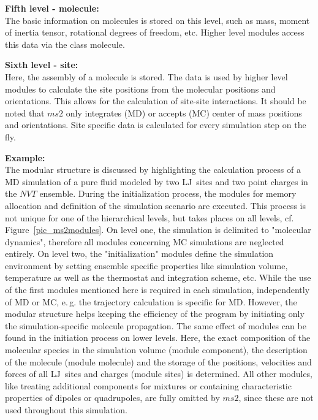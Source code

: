 \textbf{Fifth level - molecule:}\\
The basic information on molecules is stored on this level, such as mass, moment of inertia tensor, rotational degrees of freedom, etc. Higher level modules access this data via the class molecule.

\textbf{Sixth level - site:}\\
Here, the assembly of a molecule is stored. The data is used by higher level modules to calculate the site positions from the molecular positions and orientations. This allows for the calculation of site-site interactions. It should be noted that $ms2$ only integrates (MD) or accepts (MC) center of mass positions and orientations. Site specific data is calculated for every simulation step on the fly.
% 

\textbf{Example:}\\
The modular structure is discussed by highlighting the calculation process of a MD simulation of a pure fluid modeled by two LJ~sites and two point charges in the $NVT$ ensemble. During the initialization process, the modules for memory allocation and definition of the simulation scenario are executed. This process is not unique for one of the hierarchical levels, but takes places on all levels, cf. Figure~\ref{pic_ms2modules}. On level one, the simulation is delimited to "molecular dynamics", therefore all modules concerning MC simulations are neglected entirely. 
On level two, the "initialization" modules define the simulation environment by setting ensemble specific properties like simulation volume, temperature as well as the thermostat and integration scheme, etc. While the use of the first modules mentioned here is required in each simulation, independently of MD or MC, e.\,g. the trajectory calculation is specific for MD. However, the modular structure helps keeping the efficiency of the program by initiating only the simulation-specific molecule propagation. The same effect of modules can be found in the initiation process on lower levels. Here, the exact composition of the molecular species in the simulation volume (module component), the description of the molecule (module molecule) and the storage of the positions, velocities and forces of all LJ~sites and charges (module sites) is determined. All other modules, like treating additional components for mixtures or containing characteristic properties of dipoles or quadrupoles, are fully omitted by $ms2$, since these are not used throughout this simulation.\\
 
